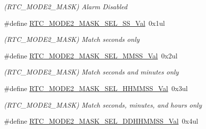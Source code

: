 \begin{DoxyCompactItemize}
\begin{DoxyCompactList}\small\item\em (R\+T\+C\+\_\+\+M\+O\+D\+E2\+\_\+\+M\+A\+S\+K) Alarm Disabled \end{DoxyCompactList}\item 
\hypertarget{group___s_a_m_l21___r_t_c_gaf9fdace41ce544294152c18f4a54da24}{}\#define \hyperlink{group___s_a_m_l21___r_t_c_gaf9fdace41ce544294152c18f4a54da24}{R\+T\+C\+\_\+\+M\+O\+D\+E2\+\_\+\+M\+A\+S\+K\+\_\+\+S\+E\+L\+\_\+\+S\+S\+\_\+\+Val}~0x1ul\label{group___s_a_m_l21___r_t_c_gaf9fdace41ce544294152c18f4a54da24}

\begin{DoxyCompactList}\small\item\em (R\+T\+C\+\_\+\+M\+O\+D\+E2\+\_\+\+M\+A\+S\+K) Match seconds only \end{DoxyCompactList}\item 
\hypertarget{group___s_a_m_l21___r_t_c_ga03a70aab4146b9dc3c0d006a53ac8e49}{}\#define \hyperlink{group___s_a_m_l21___r_t_c_ga03a70aab4146b9dc3c0d006a53ac8e49}{R\+T\+C\+\_\+\+M\+O\+D\+E2\+\_\+\+M\+A\+S\+K\+\_\+\+S\+E\+L\+\_\+\+M\+M\+S\+S\+\_\+\+Val}~0x2ul\label{group___s_a_m_l21___r_t_c_ga03a70aab4146b9dc3c0d006a53ac8e49}

\begin{DoxyCompactList}\small\item\em (R\+T\+C\+\_\+\+M\+O\+D\+E2\+\_\+\+M\+A\+S\+K) Match seconds and minutes only \end{DoxyCompactList}\item 
\hypertarget{group___s_a_m_l21___r_t_c_ga1532e3d7070bf4153a7bb52edfe551c0}{}\#define \hyperlink{group___s_a_m_l21___r_t_c_ga1532e3d7070bf4153a7bb52edfe551c0}{R\+T\+C\+\_\+\+M\+O\+D\+E2\+\_\+\+M\+A\+S\+K\+\_\+\+S\+E\+L\+\_\+\+H\+H\+M\+M\+S\+S\+\_\+\+Val}~0x3ul\label{group___s_a_m_l21___r_t_c_ga1532e3d7070bf4153a7bb52edfe551c0}

\begin{DoxyCompactList}\small\item\em (R\+T\+C\+\_\+\+M\+O\+D\+E2\+\_\+\+M\+A\+S\+K) Match seconds, minutes, and hours only \end{DoxyCompactList}\item 
\hypertarget{group___s_a_m_l21___r_t_c_ga27f1ca1d54a34f2076fd1d03d2cee5bf}{}\#define \hyperlink{group___s_a_m_l21___r_t_c_ga27f1ca1d54a34f2076fd1d03d2cee5bf}{R\+T\+C\+\_\+\+M\+O\+D\+E2\+\_\+\+M\+A\+S\+K\+\_\+\+S\+E\+L\+\_\+\+D\+D\+H\+H\+M\+M\+S\+S\+\_\+\+Val}~0x4ul\label{group___s_a_m_l21___r_t_c_ga27f1ca1d54a34f2076fd1d03d2cee5bf}


\end{DoxyCompactItemize}
